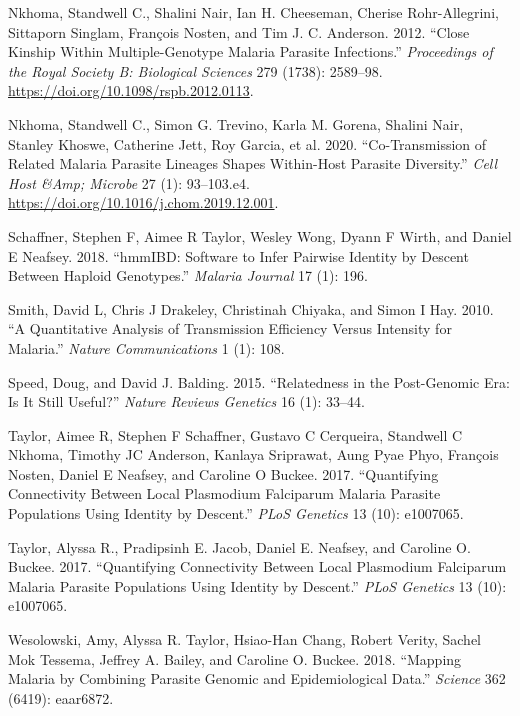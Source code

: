 \documentclass[
  11pt,
]{article}
\newlength{\cslhangindent}
\newenvironment{CSLReferences}[2] %
 {\begin{list}{}{%
  \setlength{\itemindent}{0pt}
  \setlength{\leftmargin}{0pt}
  \setlength{\parsep}{0pt}
  \ifodd #1
   \setlength{\leftmargin}{\cslhangindent}
   \setlength{\itemindent}{-1\cslhangindent}
  \fi
  \setlength{\itemsep}{#2\baselineskip}}}
 {\end{list}}
\begin{document}
\begin{CSLReferences}{1}{0}
Nkhoma, Standwell C., Shalini Nair, Ian H. Cheeseman, Cherise
Rohr-Allegrini, Sittaporn Singlam, François Nosten, and Tim J. C.
Anderson. 2012. {``Close Kinship Within Multiple-Genotype Malaria
Parasite Infections.''} \emph{Proceedings of the Royal Society B:
Biological Sciences} 279 (1738): 2589--98.
\url{https://doi.org/10.1098/rspb.2012.0113}.

Nkhoma, Standwell C., Simon G. Trevino, Karla M. Gorena, Shalini Nair,
Stanley Khoswe, Catherine Jett, Roy Garcia, et al. 2020.
{``Co-Transmission of Related Malaria Parasite Lineages Shapes
Within-Host Parasite Diversity.''} \emph{Cell Host \&Amp; Microbe} 27
(1): 93--103.e4. \url{https://doi.org/10.1016/j.chom.2019.12.001}.

Schaffner, Stephen F, Aimee R Taylor, Wesley Wong, Dyann F Wirth, and
Daniel E Neafsey. 2018. {``hmmIBD: Software to Infer Pairwise Identity
by Descent Between Haploid Genotypes.''} \emph{Malaria Journal} 17 (1):
196.

Smith, David L, Chris J Drakeley, Christinah Chiyaka, and Simon I Hay.
2010. {``A Quantitative Analysis of Transmission Efficiency Versus
Intensity for Malaria.''} \emph{Nature Communications} 1 (1): 108.

Speed, Doug, and David J. Balding. 2015. {``Relatedness in the
Post-Genomic Era: Is It Still Useful?''} \emph{Nature Reviews Genetics}
16 (1): 33--44.

Taylor, Aimee R, Stephen F Schaffner, Gustavo C Cerqueira, Standwell C
Nkhoma, Timothy JC Anderson, Kanlaya Sriprawat, Aung Pyae Phyo, François
Nosten, Daniel E Neafsey, and Caroline O Buckee. 2017. {``Quantifying
Connectivity Between Local Plasmodium Falciparum Malaria Parasite
Populations Using Identity by Descent.''} \emph{PLoS Genetics} 13 (10):
e1007065.

Taylor, Alyssa R., Pradipsinh E. Jacob, Daniel E. Neafsey, and Caroline
O. Buckee. 2017. {``Quantifying Connectivity Between Local Plasmodium
Falciparum Malaria Parasite Populations Using Identity by Descent.''}
\emph{PLoS Genetics} 13 (10): e1007065.

Wesolowski, Amy, Alyssa R. Taylor, Hsiao-Han Chang, Robert Verity,
Sachel Mok Tessema, Jeffrey A. Bailey, and Caroline O. Buckee. 2018.
{``Mapping Malaria by Combining Parasite Genomic and Epidemiological
Data.''} \emph{Science} 362 (6419): eaar6872.


\end{CSLReferences}
\end{document}
